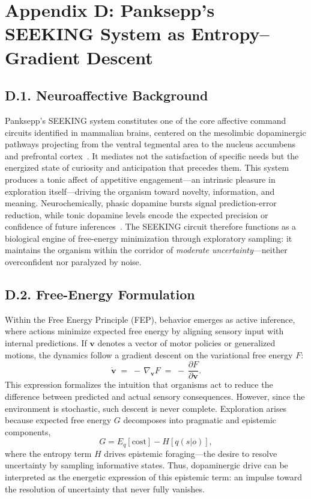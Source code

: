 \documentclass[12pt,a4paper]{article}
\begin{document}
\section*{Appendix D: Panksepp’s SEEKING System as Entropy–Gradient Descent}

\subsection*{D.1. Neuroaffective Background}

Panksepp’s \textsc{SEEKING} system constitutes one of the core affective command circuits identified in mammalian brains, centered on the mesolimbic dopaminergic pathways projecting from the ventral tegmental area to the nucleus accumbens and prefrontal cortex~\citep{panksepp1998affective,panksepp2012archaeology}.  
It mediates not the satisfaction of specific needs but the energized state of curiosity and anticipation that precedes them.  
This system produces a tonic affect of appetitive engagement—an intrinsic pleasure in exploration itself—driving the organism toward novelty, information, and meaning.  
Neurochemically, phasic dopamine bursts signal prediction-error reduction, while tonic dopamine levels encode the expected precision or confidence of future inferences~\citep{friston2017dopamine}.  
The \textsc{SEEKING} circuit therefore functions as a biological engine of free-energy minimization through exploratory sampling: it maintains the organism within the corridor of \emph{moderate uncertainty}—neither overconfident nor paralyzed by noise.

\subsection*{D.2. Free-Energy Formulation}

Within the Free Energy Principle (FEP), behavior emerges as active inference, where actions minimize expected free energy by aligning sensory input with internal predictions.  
If $\mathbf{v}$ denotes a vector of motor policies or generalized motions, the dynamics follow a gradient descent on the variational free energy $F$:
\[
\dot{\mathbf{v}} \;=\; -\,\nabla_{\mathbf{v}}F \;=\; -\,\frac{\partial F}{\partial \mathbf{v}}.
\]
This expression formalizes the intuition that organisms act to reduce the difference between predicted and actual sensory consequences.  
However, since the environment is stochastic, such descent is never complete.  
Exploration arises because expected free energy $G$ decomposes into pragmatic and epistemic components,
\[
G = E_q[\text{cost}] - H[q(s|o)] ,
\]
where the entropy term $H$ drives epistemic foraging—the desire to resolve uncertainty by sampling informative states.  
Thus, dopaminergic drive can be interpreted as the energetic expression of this epistemic term: an impulse toward the resolution of uncertainty that never fully vanishes.
\end{document}
